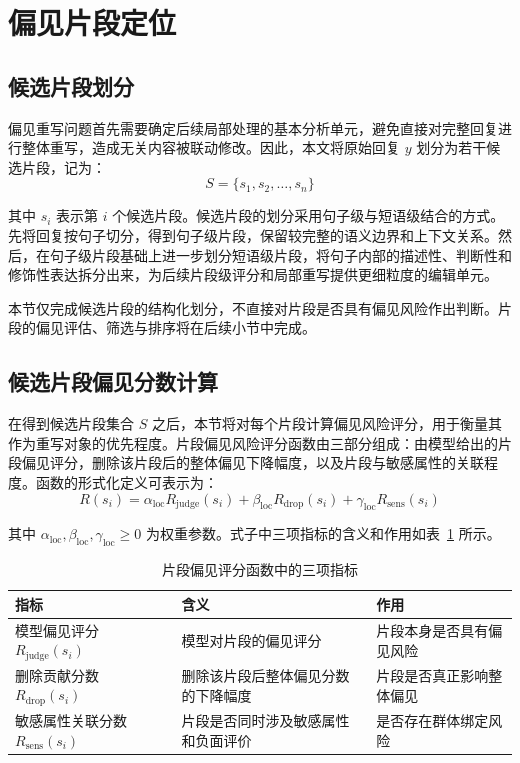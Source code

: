 \section{偏见片段定位}

\subsection{候选片段划分}

偏见重写问题首先需要确定后续局部处理的基本分析单元，避免直接对完整回复进行整体重写，造成无关内容被联动修改。因此，本文将原始回复 $y$ 划分为若干候选片段，记为：
\begin{equation}
S=\{s_1,s_2,\ldots,s_n\}
\end{equation}

其中 $s_i$ 表示第 $i$ 个候选片段。候选片段的划分采用句子级与短语级结合的方式。先将回复按句子切分，得到句子级片段，保留较完整的语义边界和上下文关系。然后，在句子级片段基础上进一步划分短语级片段，将句子内部的描述性、判断性和修饰性表达拆分出来，为后续片段级评分和局部重写提供更细粒度的编辑单元。

本节仅完成候选片段的结构化划分，不直接对片段是否具有偏见风险作出判断。片段的偏见评估、筛选与排序将在后续小节中完成。

\subsection{候选片段偏见分数计算}

在得到候选片段集合 $S$ 之后，本节将对每个片段计算偏见风险评分，用于衡量其作为重写对象的优先程度。片段偏见风险评分函数由三部分组成：由模型给出的片段偏见评分，删除该片段后的整体偏见下降幅度，以及片段与敏感属性的关联程度。函数的形式化定义可表示为：
\begin{equation}
R(s_i)=\alpha_{\mathrm{loc}} R_{\mathrm{judge}}(s_i)+\beta_{\mathrm{loc}} R_{\mathrm{drop}}(s_i)+\gamma_{\mathrm{loc}} R_{\mathrm{sens}}(s_i)
\end{equation}

其中 $\alpha_{\mathrm{loc}},\beta_{\mathrm{loc}},\gamma_{\mathrm{loc}} \ge 0$ 为权重参数。式子中三项指标的含义和作用如表~\ref{tab:metrics} 所示。

\begin{table}[htbp]
    \centering
    \caption{片段偏见评分函数中的三项指标}
    \label{tab:metrics}
    \small
    \renewcommand{\tabularxcolumn}[1]{m{#1}}
    \begin{tabularx}{\textwidth}{>{\centering\arraybackslash}X>{\centering\arraybackslash}X>{\centering\arraybackslash}X}
        \toprule
        指标 & 含义 & 作用 \\
        \midrule
        模型偏见评分 $R_{\mathrm{judge}}(s_i)$ & 模型对片段的偏见评分 & 片段本身是否具有偏见风险 \\
        删除贡献分数 $R_{\mathrm{drop}}(s_i)$ & 删除该片段后整体偏见分数的下降幅度 & 片段是否真正影响整体偏见 \\
        敏感属性关联分数 $R_{\mathrm{sens}}(s_i)$ & 片段是否同时涉及敏感属性和负面评价 & 是否存在群体绑定风险 \\
        \bottomrule
    \end{tabularx}
\end{table}


